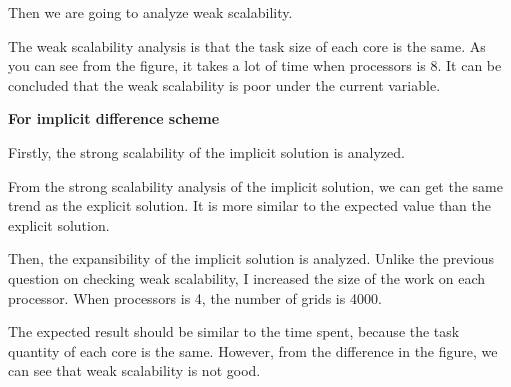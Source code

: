 \documentclass[a4paper]{article}
\begin{document}
        Then we are going to analyze weak scalability.
        \begin{figure}[H]
            \centering  
            \label{Fig.time2}
        \end{figure}
        The weak scalability analysis is that the task size of each core is the same. As you can see from the figure, it takes a lot of time when processors is 8.
        It can be concluded that the weak scalability is poor under the current variable.

        \textbf{For implicit difference scheme}

        Firstly, the strong scalability of the implicit solution is analyzed. 
        \begin{figure}[H]
            \centering  
            \label{Fig.time3}
        \end{figure}
        From the strong scalability analysis of the implicit solution, we can get the same trend as the explicit solution. It is more similar to the expected value than the explicit solution.

        Then, the expansibility of the implicit solution is analyzed. Unlike the previous question on checking weak scalability, I increased the size of the work on each processor. When processors is 4, the number of grids is 4000.
        \begin{figure}[H]
            \centering  
            \label{Fig.time4}
        \end{figure}
        The expected result should be similar to the time spent, because the task quantity of each core is the same. However, from the difference in the figure, we can see that weak scalability is not good.
\end{document}
